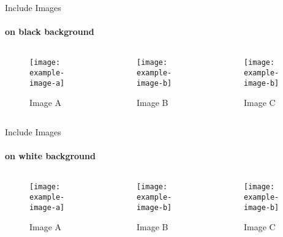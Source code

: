 \begin{frame}{Include Images}
\framesubtitle{on black background}
	\begin{columns}
		\begin{column}{0.3\textwidth}
			\begin{figure}
				\texttt{[image: example-image-a]}
				\caption{Image A}
			\end{figure}
		\end{column}
		\begin{column}{0.3\textwidth}
			\begin{figure}
				\texttt{[image: example-image-b]}
				\caption{Image B}
			\end{figure}
		\end{column}
		\begin{column}{0.3\textwidth}
			\begin{figure}
				\texttt{[image: example-image-b]}
				\caption{Image C}
			\end{figure}
		\end{column}
	\end{columns}
	
	\vspace{1em}
\end{frame}

\begin{frame}[minimal]{Include Images}
\framesubtitle{on white background}
	\begin{columns}
		\begin{column}{0.3\textwidth}
			\begin{figure}
				\texttt{[image: example-image-a]}
				\caption{Image A}
			\end{figure}
		\end{column}
		\begin{column}{0.3\textwidth}
			\begin{figure}
				\texttt{[image: example-image-b]}
				\caption{Image B}
			\end{figure}
		\end{column}
		\begin{column}{0.3\textwidth}
			\begin{figure}
				\texttt{[image: example-image-b]}
				\caption{Image C}
			\end{figure}
		\end{column}
	\end{columns}
	
	\vspace{1em}
\end{frame}
